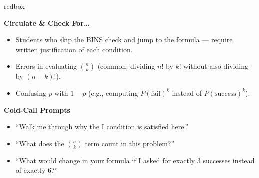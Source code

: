 \documentclass[10pt]{article}
\begin{document}
\begin{skillbox}{redbox}
\begin{minipage}[t]{0.48\linewidth}
    \textbf{Circulate \& Check For\ldots}
    \begin{itemize}
        \item Students who skip the BINS check and jump to the formula ---
              require written justification of each condition.
        \item Errors in evaluating $\binom{n}{k}$ (common: dividing $n!$ by $k!$
              without also dividing by $(n-k)!$).
        \item Confusing $p$ with $1-p$ (e.g., computing $P(\text{fail})^k$ instead
              of $P(\text{success})^k$).
    \end{itemize}
\end{minipage}
\hfill
\begin{minipage}[t]{0.48\linewidth}
    \textbf{Cold-Call Prompts}
    \begin{itemize}
        \item ``Walk me through why the I condition is satisfied here.''
        \item ``What does the $\binom{n}{k}$ term count in this problem?''
        \item ``What would change in your formula if I asked for exactly 3
              successes instead of exactly 6?''
    \end{itemize}
\end{minipage}
\end{skillbox}
\end{document}
